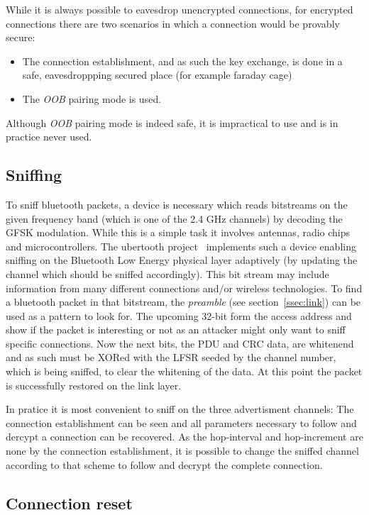 \documentclass[conference]{IEEEtran}
\begin{document}
While it is always possible to eavesdrop unencrypted connections, for encrypted connections there are two scenarios in which a connection would be provably secure:
\begin{itemize}
  \item The connection establishment, and as such the key exchange, is done in a safe, eavesdroppping secured place (for example faraday cage)
  \item The \emph{OOB} pairing mode is used.
\end{itemize}

Although \emph{OOB} pairing mode is indeed safe, it is impractical to use and is in practice never used.

\subsection{Sniffing}

To sniff bluetooth packets, a device is necessary which reads bitstreams on the given frequency band (which is one of the 2.4 GHz channels) by decoding the GFSK modulation. While this is a simple task it involves antennas, radio chips and microcontrollers. The ubertooth project~\cite{ubertooth} implements such a device enabling sniffing on the Bluetooth Low Energy physical layer adaptively (by updating the channel which should be sniffed accordingly). This bit stream may include information from many different connections and/or wireless technologies. To find a bluetooth packet in that bitstream, the \emph{preamble} (see section~\ref{ssec:link}) can be used as a pattern to look for. The upcoming 32-bit form the access address and show if the packet is interesting or not as an attacker might only want to sniff specific connections. Now the next bits, the PDU and CRC data, are whitenend and as such must be XORed with the LFSR seeded by the channel number, which is being sniffed, to clear the whitening of the data. At this point the packet is successfully restored on the link layer.

In pratice it is most convenient to sniff on the three advertisment channels: The connection establishment can be seen and all parameters necessary to follow and dercypt a connection can be recovered. As the hop-interval and hop-increment are none by the connection establishment, it is possible to change the sniffed channel according to that scheme to follow and decrypt the complete connection.

\subsection{Connection reset} \label{ssec:conreset}
\end{document}
